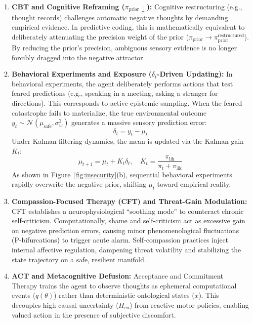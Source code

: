 \documentclass[conference]{IEEEtran}
\begin{document}
\begin{enumerate}
    \item \textbf{CBT and Cognitive Reframing ($\pi_{\text{prior}} \downarrow$):} Cognitive restructuring (e.g., thought records) challenges automatic negative thoughts by demanding empirical evidence. In predictive coding, this is mathematically equivalent to deliberately attenuating the precision weight of the prior ($\pi_{\text{prior}} \to \pi_{\text{prior}}^{\text{restructured}}$). By reducing the prior's precision, ambiguous sensory evidence is no longer forcibly dragged into the negative attractor.
    \item \textbf{Behavioral Experiments and Exposure ($\delta_t$-Driven Updating):} In behavioral experiments, the agent deliberately performs actions that test feared predictions (e.g., speaking in a meeting, asking a stranger for directions). This corresponds to active epistemic sampling. When the feared catastrophe fails to materialize, the true environmental outcome $y_t \sim \mathcal{N}(\mu_{\text{safe}}, \sigma_w^2)$ generates a massive sensory prediction error:
    \begin{equation}
        \delta_t = y_t - \mu_t
    \end{equation}
    Under Kalman filtering dynamics, the mean is updated via the Kalman gain $K_t$:
    \begin{equation}
        \mu_{t+1} = \mu_t + K_t \delta_t, \quad K_t = \frac{\pi_{\text{lik}}}{\pi_t + \pi_{\text{lik}}}
    \end{equation}
    As shown in Figure~\ref{fig:insecurity}(b), sequential behavioral experiments rapidly overwrite the negative prior, shifting $\mu_t$ toward empirical reality.
    \item \textbf{Compassion-Focused Therapy (CFT) and Threat-Gain Modulation:} CFT establishes a neurophysiological ``soothing mode'' to counteract chronic self-criticism. Computationally, shame and self-criticism act as excessive gain on negative prediction errors, causing minor phenomenological fluctuations (P-bifurcations) to trigger acute alarm. Self-compassion practices inject internal affective regulation, dampening threat volatility and stabilizing the state trajectory on a safe, resilient manifold.
    \item \textbf{ACT and Metacognitive Defusion:} Acceptance and Commitment Therapy trains the agent to observe thoughts as ephemeral computational events ($q(\theta)$) rather than deterministic ontological states ($x$). This decouples high causal uncertainty ($H_{cu}$) from reactive motor policies, enabling valued action in the presence of subjective discomfort.
\end{enumerate}
\end{document}
